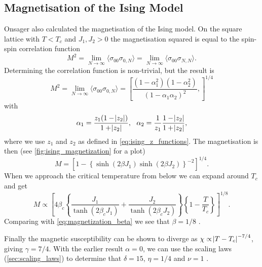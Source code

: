 \documentclass[11pt, a4paper]{report} %
\begin{document}
\subsection{Magnetisation of the Ising Model}\label{sec:ising_magnetization}

Onsager also calculated the magnetisation of the Ising model.
On the square lattice with \(T < T_c\) and \(J_1, J_2 > 0\) the magnetisation squared is equal to the spin-spin correlation function
\begin{equation}
	M^2 = \lim_{N \to \infty} \langle \sigma_{00} \sigma_{0,N} \rangle = \lim_{N \to \infty} \langle \sigma_{00} \sigma_{N, N} \rangle.
\end{equation}
Determining the correlation function is non-trivial, but the result is
\begin{equation}
	M^2 = \lim_{N \to \infty} \langle \sigma_{00} \sigma_{0,N} \rangle = \left[ \frac{(1-\alpha_1^2)(1-\alpha_2^2)}{(1-\alpha_1 \alpha_2)^2}, \right]^{1/4}
\end{equation}
with
\begin{equation}
	\alpha_1 = \frac{z_1(1-\abs{z_2})}{1+\abs{z_2}},\ \ \alpha_2 = \frac{1}{z_1}\frac{1-\abs{z_2}}{1+\abs{z_2}},
\end{equation}
where we use \(z_1\) and \(z_2\) as defined in \cref{eq:ising_z_functions}.
The magnetisation is then (see \cref{fig:ising_magnetization} for a plot)
\begin{equation}
	M = \left[1 - \left\{\sinh(2\beta J_1)\sinh(2 \beta J_2)\right\}^{-2} \right]^{1/4}.
\end{equation}
When we approach the critical temperature from below we can expand around \(T_c\) and get
\begin{equation}
	M \propto \left[4\beta_c\left\{\frac{J_1}{\tanh(2\beta_c J_1)} + \frac{J_2}{\tanh(2\beta_c J_2)}\right\} \left\{1-\frac{T}{T_c}\right\}\right]^{1/8}.
\end{equation}
Comparing with \cref{eq:magnetization_beta} we see that \(\beta = 1/8\) \cite{wu:1982}.

Finally the magnetic susceptibility can be shown to diverge as \(\chi \propto \abs{T - T_c}^{-7/4}\), giving \(\gamma = 7/4\).
With the earlier result \(\alpha=0\), we can use the scaling laws (\cref{sec:scaling_laws}) to determine that \(\delta = 15\), \(\eta = 1/4\) and \(\nu = 1\) \cite{binney:1992}.
\end{document}
